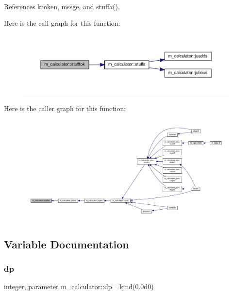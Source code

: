 References ktoken, mssge, and stuffa().

Here is the call graph for this function\+:
\nopagebreak
\begin{figure}[H]
\begin{center}
\leavevmode
\includegraphics[width=350pt]{namespacem__calculator_ae4cc2211f8bd276d5765e4ebc9d6e354_cgraph}
\end{center}
\end{figure}
Here is the caller graph for this function\+:
\nopagebreak
\begin{figure}[H]
\begin{center}
\leavevmode
\includegraphics[width=350pt]{namespacem__calculator_ae4cc2211f8bd276d5765e4ebc9d6e354_icgraph}
\end{center}
\end{figure}


\subsection{Variable Documentation}
\mbox{\label{namespacem__calculator_aefb5a6c3001bb0f09ed82decb6def950}} 
\subsubsection{\texorpdfstring{dp}{dp}}
{\footnotesize\ttfamily integer, parameter m\+\_\+calculator\+::dp =kind(0.\+0d0)}

